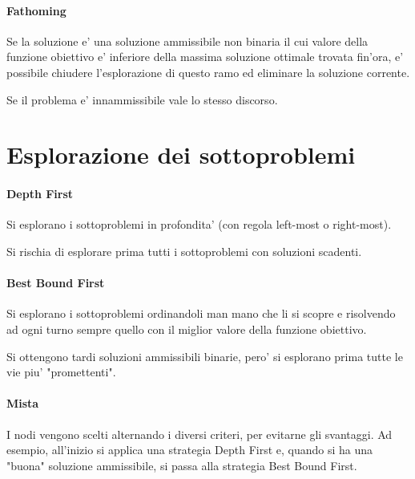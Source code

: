 \paragraph{Fathoming}

Se la soluzione e' una soluzione ammissibile non binaria il cui valore della funzione obiettivo e' inferiore della massima soluzione ottimale trovata fin'ora, e' possibile chiudere l'esplorazione di questo ramo ed eliminare la soluzione corrente.

Se il problema e' innammissibile vale lo stesso discorso.

\section{Esplorazione dei sottoproblemi}

\paragraph{Depth First}

Si esplorano i sottoproblemi in profondita' (con regola left-most o right-most).

Si rischia di esplorare prima tutti i sottoproblemi con soluzioni scadenti.

\paragraph{Best Bound First}

Si esplorano i sottoproblemi ordinandoli man mano che li si scopre e risolvendo ad ogni turno sempre quello con il miglior valore della funzione obiettivo.

Si ottengono tardi soluzioni ammissibili binarie, pero' si esplorano prima tutte le vie piu' "promettenti".

\paragraph{Mista}

I nodi vengono scelti alternando i diversi criteri, per evitarne gli svantaggi.
Ad esempio, all'inizio si applica una strategia Depth First e, quando si ha una "buona" soluzione ammissibile,
si passa alla strategia Best Bound First.

